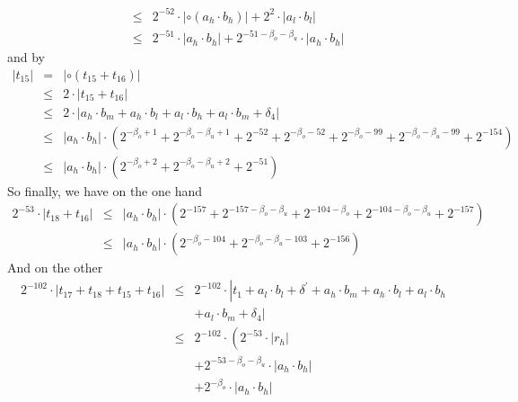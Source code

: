 \documentclass[a4paper,10pt,twoside]{article}
\newenvironment{proof}[1][Proof]{\begin{trivlist}
\item[\hskip \labelsep {\bfseries #1}]}{\end{trivlist}}
\newcommand{\hi}{\ensuremath{\mathit{h}}}
\newcommand{\mi}{\ensuremath{\mathit{m}}}
\newcommand{\lo}{\ensuremath{\mathit{l}}}
\begin{document}
\begin{proof}
\begin{eqnarray*}
& \leq & 2^{-52} \cdot \left \vert \circ \left( a_\hi \cdot b_\hi \right) \right \vert + 2^2 \cdot \left \vert a_\lo \cdot b_\lo \right \vert \\
& \leq & 2^{-51} \cdot \left \vert a_\hi \cdot b_\hi \right \vert + 2^{-51-\beta_o-\beta_u} \cdot \left \vert a_\hi \cdot b_\hi \right \vert 
\end{eqnarray*}
and by
\begin{eqnarray*}
\left \vert t_{15} \right \vert & = & \left \vert \circ \left( t_{15} + t_{16} \right) \right \vert \\
& \leq & 2 \cdot \left \vert t_{15} + t_{16} \right \vert \\
& \leq & 2 \cdot \left \vert 
a_\hi \cdot b_\mi + a_\hi \cdot b_\lo + a_\lo \cdot b_\hi + a_\lo \cdot b_\mi + \delta_4 \right \vert \\
& \leq & \left \vert a_\hi \cdot b_\hi \right \vert \cdot \left( 
2^{-\beta_o+1} + 2^{-\beta_o-\beta_u+1} + 2^{-52} + 2^{-\beta_o-52} + 2^{-\beta_o-99} + 2^{-\beta_o-\beta_u-99} + 2^{-154}  \right) \\
& \leq & \left \vert a_\hi \cdot b_\hi \right \vert \cdot \left( 2^{-\beta_o+2} + 2^{-\beta_o-\beta_u+2} + 2^{-51}  \right)
\end{eqnarray*}
So finally, we have on the one hand 
\begin{eqnarray*}
2^{-53} \cdot \left \vert t_{18} + t_{16} \right \vert & \leq & 
\left \vert a_\hi \cdot b_\hi \right \vert \cdot \left( 2^{-157} + 2^{-157-\beta_o-\beta_u} + 2^{-104-\beta_o} + 
2^{-104-\beta_o-\beta_u} + 2^{-157}  \right) \\
& \leq & \left \vert a_\hi \cdot b_\hi \right \vert \cdot \left( 2^{-\beta_o-104} + 2^{-\beta_o-\beta_u-103} + 2^{-156} \right)
\end{eqnarray*}
And on the other
\begin{eqnarray*}
2^{-102} \cdot \left \vert t_{17} + t_{18} + t_{15} + t_{16} \right \vert & \leq &
2^{-102} \cdot \left \vert t_1 + a_\lo \cdot b_\lo + \delta^\prime + a_\hi \cdot b_\mi + a_\hi \cdot b_\lo + 
a_\lo \cdot b_\hi \right. \\ & & \left. + a_\lo \cdot b_\mi + \delta_4 \right \vert \\
& \leq & 2^{-102} \cdot \left( 2^{-53} \cdot \left \vert r_\hi \right \vert \right. \\
& & + 2^{-53-\beta_o-\beta_u} \cdot \left \vert a_\hi \cdot b_\hi \right \vert \\
& & + 2^{-\beta_o} \cdot \left \vert a_\hi \cdot b_\hi \right \vert \\

\end{eqnarray*}
\end{proof}
\end{document}
